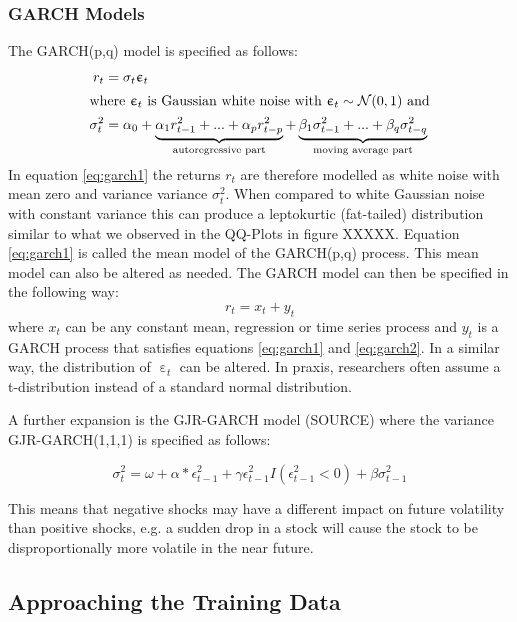 \subsubsection{GARCH Models}
The GARCH(p,q) model is specified as follows:
\begin{align}
    r_{t} &= \sigma_t  \upepsilon_t \label{eq:garch1}\\
\intertext{where $\upepsilon_t$ is Gaussian white noise with  $\upepsilon_t \sim \mathcal{N}(0,1)$ and}
    \sigma^2_t &= \alpha_0 + \underbrace{\alpha_1 r^2_{t-1} + ... + \alpha_p r^2_{t-p}}_\text{autoregressive part} + \underbrace{\beta_1 \sigma^2_{t-1} + ... + \beta_q \sigma^2_{t-q}}_\text{moving average part} \label{eq:garch2}
\end{align}{}
In equation \ref{eq:garch1} the returns $r_t$ are therefore modelled as white noise with mean zero and variance variance $\sigma^2_t$. When compared to white Gaussian noise with constant variance this can produce a leptokurtic (fat-tailed) distribution similar to what we observed in the QQ-Plots in figure XXXXX. Equation \ref{eq:garch1} is called the mean model of the GARCH(p,q) process. This mean model can also be altered as needed. The GARCH model can then be specified in the following way: 
\begin{equation}
    r_t = x_t + y_t
\end{equation}{}
where $x_t$ can be any constant mean, regression or time series process and $y_t$ is a GARCH process that satisfies equations \ref{eq:garch1} and \ref{eq:garch2}. In a similar way, the distribution of $\upepsilon_t$ can be altered. In praxis, researchers often assume a t-distribution instead of a standard normal distribution. 

A further expansion is the GJR-GARCH model (SOURCE) where the variance GJR-GARCH(1,1,1) is specified as follows: 

\begin{equation}
    \sigma^2_t = \omega + \alpha * \epsilon^2_{t-1} + \gamma \epsilon^2_{t-1} I(\epsilon^2_{t-1} < 0) + \beta \sigma^2_{t-1} 
\end{equation}{}

This means that negative shocks may have a different impact on future volatility than positive shocks, e.g. a sudden drop in a stock will cause the stock to be disproportionally more volatile in the near future. 



\subsection{Approaching the Training Data}
